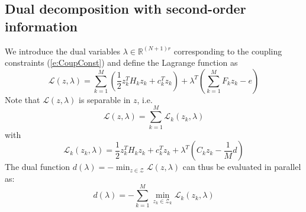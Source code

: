 
\subsection{Dual decomposition with second-order information}

We introduce the dual variables $\lambda \in \mathbb{R}^{(N+1) r}$ corresponding to the coupling constraints (\ref{e:CoupConst}) and define the Lagrange function as
\begin{equation}
\mathcal{L}(z,\lambda) =  \sum_{k=1}^{M} ( \frac{1}{2}z_k^TH_kz_k + c_k^Tz_k ) + \lambda^T ( \sum_{k=1}^{M} F_k z_k - e )
\end{equation}
Note that $\mathcal{L}(z,\lambda)$ is separable in $z$, i.e.
\begin{equation}
\mathcal{L}(z,\lambda) = \sum_{k=1}^{M} \mathcal{L}_k (z_k,\lambda)
\end{equation}
with
\begin{equation}
\mathcal{L}_k(z_k,\lambda) = \frac{1}{2}z_k^TH_k z_k + c_k^T z_k + \lambda^T(C_k z_k - \frac{1}{M}d)
\end{equation}
The dual function $d(\lambda) = -\min_{z \in \mathcal{Z}} \mathcal{L}(z,\lambda)$ can thus be evaluated in parallel as:
\begin{equation}
\label{e:dualfunction}
d(\lambda) = -\sum_{k=1}^M \min_{z_k \in \mathcal{Z}_k} \mathcal{L}_k(z_k,\lambda)
\end{equation}

